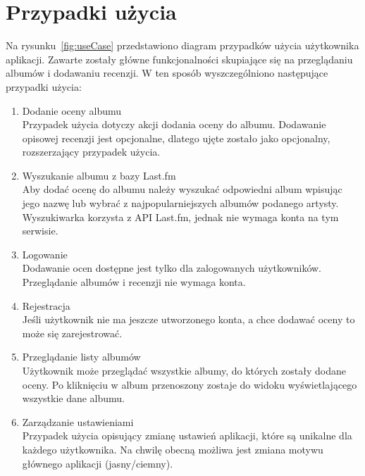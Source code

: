 \section{Przypadki użycia}
	Na rysunku~\ref{fig:useCase} przedstawiono diagram przypadków użycia użytkownika aplikacji.
	Zawarte zostały główne funkcjonalności skupiające się na przeglądaniu albumów i dodawaniu recenzji.
	W ten sposób wyszczególniono następujące przypadki użycia:
	\begin{enumerate}
		\item Dodanie oceny albumu\\
			Przypadek użycia dotyczy akcji dodania oceny do albumu.
			Dodawanie opisowej recenzji jest opcjonalne, dlatego ujęte zostało jako opcjonalny, rozszerzający przypadek użycia.

		\item Wyszukanie albumu z bazy Last.fm\\
			Aby dodać ocenę do albumu należy wyszukać odpowiedni album wpisując jego nazwę lub wybrać z najpopularniejszych albumów podanego artysty.
			Wyszukiwarka korzysta z API Last.fm, jednak nie wymaga konta na tym serwisie.

		\item Logowanie\\
			Dodawanie ocen dostępne jest tylko dla zalogowanych użytkowników.
			Przeglądanie albumów i recenzji nie wymaga konta.
		
		\item Rejestracja\\
			Jeśli użytkownik nie ma jeszcze utworzonego konta, a chce dodawać oceny to może się zarejestrować.

		\item Przeglądanie listy albumów\\
			Użytkownik może przeglądać wszystkie albumy, do których zostały dodane oceny.
			Po kliknięciu w album przenoszony zostaje do widoku wyświetlającego wszystkie dane albumu.

		\item Zarządzanie ustawieniami\\
			Przypadek użycia opisujący zmianę ustawień aplikacji, które są unikalne dla każdego użytkownika.
			Na chwilę obecną możliwa jest zmiana motywu głównego aplikacji (jasny/ciemny).

	\end{enumerate}
	
